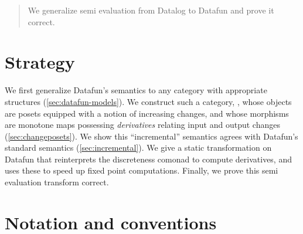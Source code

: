 \maketitle

\begin{abstract}
  We generalize semi\naive{} evaluation from Datalog to Datafun and prove it
  correct.
\end{abstract}

\section{Strategy}
We first generalize Datafun's \Poset{} semantics to any category with
appropriate structures (\cref{sec:datafun-models}). We construct such a
category, \CP{}, whose objects are posets equipped with a notion of increasing
changes, and whose morphisms are monotone maps possessing \emph{derivatives}
relating input and output changes (\cref{sec:changeposets}). We show this
``incremental'' semantics agrees with Datafun's standard semantics
(\cref{sec:incremental}). We give a static transformation on Datafun that
reinterprets the discreteness comonad to compute derivatives, and uses these to
speed up fixed point computations. Finally, we prove this semi\naive{}
evaluation transform correct.



\section{Notation and conventions}

